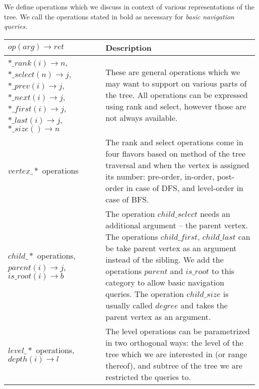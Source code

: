 We define operations which we discuss in context of various representations of the tree.
We call the operations stated in bold as necessary for \emph{basic navigation queries}.

\noindent\begin{tabularx}{\textwidth}{|L{0.7}|L{1.3}|}
	\hline
	$op(arg) \rightarrow ret$
	& Description \\ \hline \hline
	
	$*\_rank(i) \rightarrow n$, \newline
	$*\_select(n) \rightarrow j$, \newline
	$*\_prev(i) \rightarrow j$, \newline
	$*\_next(i) \rightarrow j$, \newline
	$*\_first(i) \rightarrow j$, \newline
	$*\_last(i) \rightarrow j$, \newline
	$*\_size() \rightarrow n$
	& These are general operations which we may want to support on various parts of the tree.
	All operations can be expressed using rank and select, however those are not always available. \\ \hline \hline
	
	$vertex\_*$ operations
	& The rank and select operations come in four flavors based on method of the tree traversal and when the vertex is assigned its number:
	pre-order, in-order, post-order in case of DFS, and level-order in case of BFS. \\ \hline
	
	$child\_*$ operations, \newline
	$parent(i) \rightarrow j$, \newline
	$is\_root(i) \rightarrow b$
	& The operation $child\_select$ needs an additional argument -- the parent vertex.
	The operations $child\_first$, $child\_last$ can be take parent vertex as an argument instead of the sibling.
	We add the operations $parent$ and $is\_root$ to this category to allow basic navigation queries.
	The operation $child\_size$ is usually called $degree$ and takes the parent vertex as an argument.\\ \hline

	$level\_*$ operations, \newline
	$depth(i) \rightarrow l$
	& The level operations can be parametrized in two orthogonal ways:
	the level of the tree which we are interested in (or range thereof), and subtree of the tree we are restricted the queries to. \\ \hline
	

\end{tabularx}

